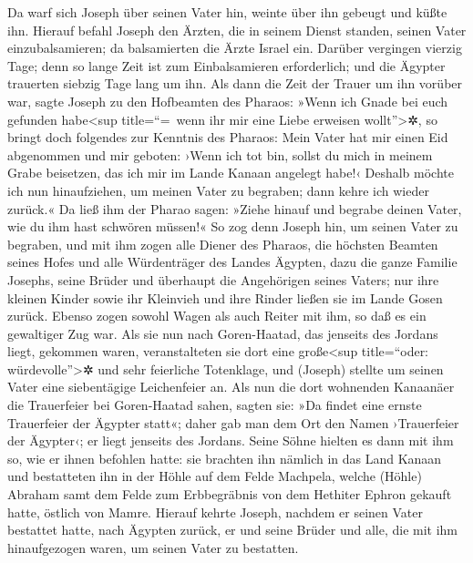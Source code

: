  Da warf sich Joseph über seinen Vater hin, weinte über
ihn gebeugt und küßte ihn.  Hierauf befahl Joseph den
Ärzten, die in seinem Dienst standen, seinen Vater einzubalsamieren; da
balsamierten die Ärzte Israel ein.  Darüber vergingen
vierzig Tage; denn so lange Zeit ist zum Einbalsamieren erforderlich;
und die Ägypter trauerten siebzig Tage lang um ihn.  Als
dann die Zeit der Trauer um ihn vorüber war, sagte Joseph zu den
Hofbeamten des Pharaos: »Wenn ich Gnade bei euch gefunden
habe\textless sup title=``=~wenn ihr mir eine Liebe erweisen
wollt''\textgreater✲, so bringt doch folgendes zur Kenntnis des Pharaos:
 Mein Vater hat mir einen Eid abgenommen und mir geboten:
›Wenn ich tot bin, sollst du mich in meinem Grabe beisetzen, das ich mir
im Lande Kanaan angelegt habe!‹ Deshalb möchte ich nun hinaufziehen, um
meinen Vater zu begraben; dann kehre ich wieder zurück.« 
Da ließ ihm der Pharao sagen: »Ziehe hinauf und begrabe deinen Vater,
wie du ihm hast schwören müssen!«  So zog denn Joseph hin,
um seinen Vater zu begraben, und mit ihm zogen alle Diener des Pharaos,
die höchsten Beamten seines Hofes und alle Würdenträger des Landes
Ägypten,  dazu die ganze Familie Josephs, seine Brüder und
überhaupt die Angehörigen seines Vaters; nur ihre kleinen Kinder sowie
ihr Kleinvieh und ihre Rinder ließen sie im Lande Gosen zurück.
 Ebenso zogen sowohl Wagen als auch Reiter mit ihm, so daß
es ein gewaltiger Zug war.  Als sie nun nach
Goren-Haatad, das jenseits des Jordans liegt, gekommen waren,
veranstalteten sie dort eine große\textless sup title=``oder:
würdevolle''\textgreater✲ und sehr feierliche Totenklage, und (Joseph)
stellte um seinen Vater eine siebentägige Leichenfeier an.
 Als nun die dort wohnenden Kanaanäer die Trauerfeier bei
Goren-Haatad sahen, sagten sie: »Da findet eine ernste Trauerfeier der
Ägypter statt«; daher gab man dem Ort den Namen ›Trauerfeier der
Ägypter‹; er liegt jenseits des Jordans.  Seine Söhne
hielten es dann mit ihm so, wie er ihnen befohlen hatte: 
sie brachten ihn nämlich in das Land Kanaan und bestatteten ihn in der
Höhle auf dem Felde Machpela, welche (Höhle) Abraham samt dem Felde zum
Erbbegräbnis von dem Hethiter Ephron gekauft hatte, östlich von Mamre.
 Hierauf kehrte Joseph, nachdem er seinen Vater bestattet
hatte, nach Ägypten zurück, er und seine Brüder und alle, die mit ihm
hinaufgezogen waren, um seinen Vater zu bestatten.

